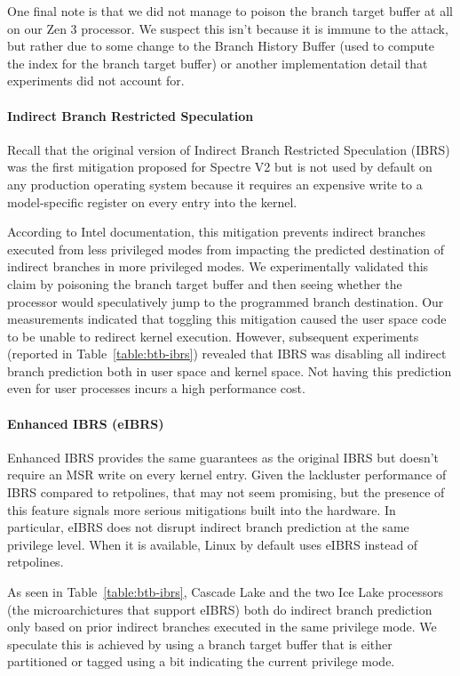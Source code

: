 One final note is that we did not manage to poison the branch target buffer at all on our Zen 3 processor.
We suspect this isn't because it is immune to the attack, but rather due to some change to the Branch History Buffer (used to compute the index for the branch target buffer) or another implementation detail that experiments did not account for.

\paragraph{Indirect Branch Restricted Speculation}

Recall that the original version of Indirect Branch Restricted Speculation (IBRS) was the first mitigation proposed for Spectre V2 but is not used by default on any production operating system because it requires an expensive write to a model-specific register on every entry into the kernel.

According to Intel documentation, this mitigation prevents indirect branches executed from less privileged modes from impacting the predicted destination of indirect branches in more privileged modes.
We experimentally validated this claim by poisoning the branch target buffer and then seeing whether the processor would speculatively jump to the programmed branch destination.
Our measurements indicated that toggling this mitigation caused the
user space code to be unable to redirect kernel execution.
However, subsequent experiments (reported in
Table~\ref{table:btb-ibrs}) revealed that IBRS was disabling all
indirect branch prediction both in user space and kernel space.
Not having this prediction even for user processes incurs a high performance cost.

\paragraph{Enhanced IBRS (eIBRS)}

Enhanced IBRS provides the same guarantees as the original IBRS but doesn't require an MSR write on every kernel entry.
Given the lackluster performance of IBRS compared to retpolines, that may not seem promising, but the presence of this feature signals more serious mitigations built into the hardware.
In particular, eIBRS does not disrupt indirect branch prediction at the same privilege level.
When it is available, Linux by default uses eIBRS instead of retpolines.

As seen in Table~\ref{table:btb-ibrs}, Cascade Lake and the two Ice Lake
processors (the microarchictures that support eIBRS) both do indirect branch prediction only based on prior indirect branches executed in the same privilege mode.
We speculate this is achieved by using a branch target buffer that is either partitioned or tagged using a bit indicating the current privilege mode.

